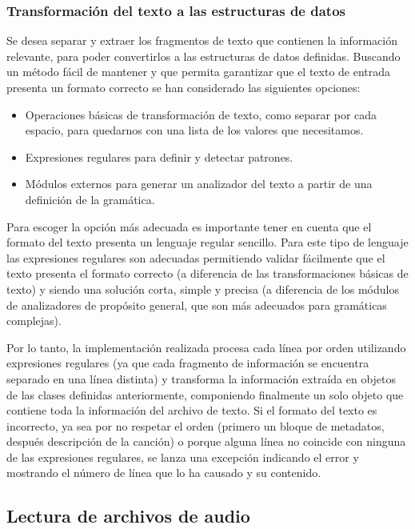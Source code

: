 \subsubsection{Transformación del texto a las estructuras de datos}

Se desea separar y extraer los fragmentos de texto que contienen la información relevante, para poder convertirlos a las estructuras de datos definidas. Buscando un método fácil de mantener y que permita garantizar que el texto de entrada presenta un formato correcto se han considerado las siguientes opciones:

\begin{itemize}
	\item{Operaciones básicas de transformación de texto, como separar por cada espacio, para quedarnos con una lista de los valores que necesitamos.}
	\item{Expresiones regulares para definir y detectar patrones.}
	\item{Módulos externos para generar un analizador del texto a partir de una definición de la gramática.}
\end{itemize}


Para escoger la opción más adecuada es importante tener en cuenta que el formato del texto presenta un lenguaje regular sencillo. Para este tipo de lenguaje las expresiones regulares son adecuadas permitiendo validar fácilmente que el texto presenta el formato correcto (a diferencia de las transformaciones básicas de texto) y siendo una solución corta, simple y precisa (a diferencia de los módulos de analizadores de propósito general, que son más adecuados para gramáticas complejas).

Por lo tanto, la implementación realizada procesa cada línea por orden utilizando expresiones regulares (ya que cada fragmento de información se encuentra separado en una línea distinta) y transforma la información extraída en objetos de las clases definidas anteriormente, componiendo finalmente un solo objeto que contiene toda la información del archivo de texto.  Si el formato del texto es incorrecto, ya sea por no respetar el orden (primero un bloque de metadatos, después descripción de la canción) o porque alguna línea no coincide con ninguna de las expresiones regulares, se lanza una excepción indicando el error y mostrando el número de línea que lo ha causado y su contenido.


\subsection{Lectura de archivos de audio}

